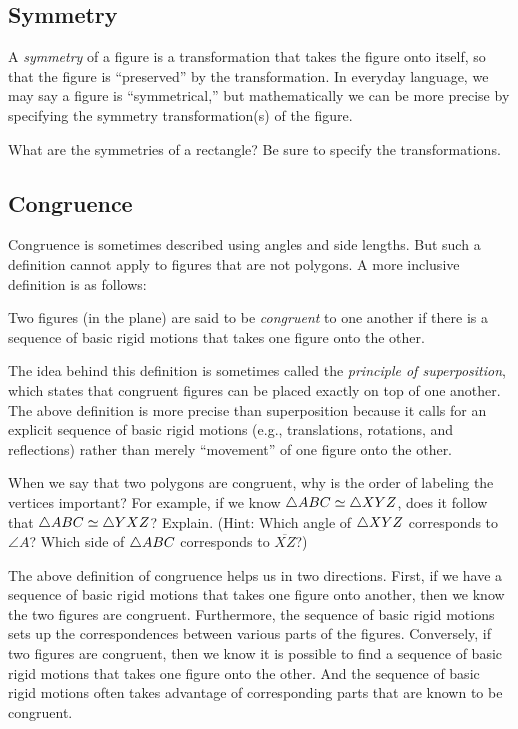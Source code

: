\subsection{Symmetry}
A \emph{symmetry} of a figure is a transformation that takes the figure onto 
itself, so that the figure is ``preserved'' by the transformation.  In everyday language, we may say a figure is ``symmetrical,'' but mathematically we can be more precise by specifying the symmetry transformation(s) of the figure.  

\begin{question}
What are the symmetries of a rectangle?  Be sure to specify the transformations.  
\end{question}
\QM


\subsection{Congruence}
Congruence is sometimes described using angles and side lengths.  But such a definition cannot apply to figures that are not polygons.  A more inclusive definition is as follows:  

\begin{definition}
Two figures (in the plane) are said to be \emph{congruent} to one another if there is a sequence of basic rigid motions that takes one figure onto the other.  
\end{definition}

The idea behind this definition is sometimes called the \emph{principle of superposition}, which states that congruent figures can be placed exactly on top of one another.  The above definition is more precise than superposition because it calls for an explicit sequence of basic rigid motions (e.g., translations, rotations, and reflections) rather than merely ``movement'' of one figure onto the other.  

\begin{question}
When we say that two polygons are congruent, why is the order of labeling the vertices important?  For example, if we know $\triangle ABC \simeq \triangle XYZ$, does it follow that $\triangle ABC \simeq \triangle YXZ$?  Explain.  (Hint:  Which angle of $\triangle XYZ$ corresponds to $\angle A$?  Which side of $\triangle ABC$ corresponds to $\overline{XZ}$?)
\end{question}
\QM

The above definition of congruence helps us in two directions.  First, if we have a sequence of basic rigid motions that takes one figure onto another, then we know the two figures are congruent.  Furthermore, the sequence of basic rigid motions sets up the correspondences between various parts of the figures.  Conversely, if two figures are congruent, then we know it is possible to find a sequence of basic rigid motions that takes one figure onto the other.  And the sequence of basic rigid motions often takes advantage of corresponding parts that are known to be congruent. 

